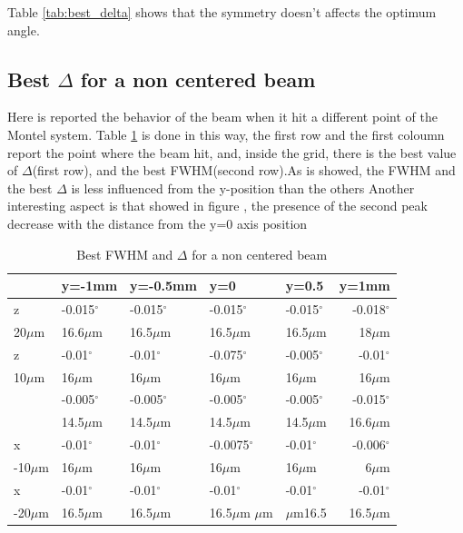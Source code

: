 \documentclass[a4paper]{article}
\begin{document}
Table \ref{tab:best_delta} shows that the symmetry doesn't affects the optimum angle.

\medskip

\subsection{Best $\Delta$ for a non centered beam}
Here is reported the behavior of the beam when it hit a different point of the Montel system. Table \ref{tab:displacement} is done in this way, the first row and the first coloumn report the point where the beam hit, and, inside the grid, there is the best value of $\Delta$(first row), and the best FWHM(second row).As is showed, the FWHM and the best $\Delta$ is less influenced from the y-position than the others
\newline
Another interesting aspect is that showed in figure , the presence of the second peak decrease with the distance from the y=0 axis position


\begin{table}[H]
\centering
\begin{tabular}{l|l|l|l|l|r}  & y=-1mm & y=-0.5mm & y=0 & y=0.5 & y=1mm\\
\hline
     z     & -0.015$^\circ$ & -0.015$^\circ$ & -0.015$^\circ$ & -0.015$^\circ$ & -0.018$^\circ$ \\
20$\mu$m   & 16.6$\mu$m & 16.5$\mu$m & 16.5$\mu$m & 16.5$\mu$m & 18$\mu$m \\
\hline
     z     & -0.01$^\circ$ & -0.01$^\circ$ &-0.075$^\circ$& -0.005$^\circ$ & -0.01$^\circ$\\
10$\mu$m   & 16$\mu$m & 16$\mu$m & 16$\mu$m & 16$\mu$m &  16$\mu$m  \\
\hline
          & -0.005$^\circ$ & -0.005$^\circ$ & -0.005$^\circ$ & -0.005$^\circ$ & -0.015$^\circ$ \\
          & 14.5$\mu$m & 14.5$\mu$m & 14.5$\mu$m & 14.5$\mu$m & 16.6$\mu$m \\
\hline
     x    & -0.01$^\circ$ & -0.01$^\circ$ & -0.0075$^\circ$ & -0.01$^\circ$ & -0.006$^\circ$ \\
-10$\mu$m & 16$\mu$m & 16$\mu$m & 16$\mu$m & 16$\mu$m & 6$\mu$m \\
\hline
     x    & -0.01$^\circ$ & -0.01$^\circ$ & -0.01$^\circ$ & -0.01$^\circ$ & -0.01$^\circ$ \\
-20$\mu$m & 16.5$\mu$m & 16.5$\mu$m & 16.5$\mu$m $\mu$m & $\mu$m16.5 & 16.5$\mu$m \\

\end{tabular}
\caption{Best FWHM and $\Delta$ for a non centered beam}
\label{tab:displacement}
\end{table}
\end{document}
